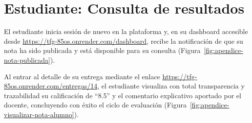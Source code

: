 
\section{Estudiante: Consulta de resultados}

El estudiante inicia sesi\'on de nuevo en la plataforma y, en su dashboard accesible desde \url{https://tfg-85os.onrender.com/dashboard}, recibe la notificaci\'on de que su nota ha sido publicada y est\'a disponible para su consulta (Figura~\ref{fig:apendice-nota-publicada}).


Al entrar al detalle de su entrega mediante el enlace \url{https://tfg-85os.onrender.com/entregas/14}, el estudiante visualiza con total transparencia y trazabilidad su calificaci\'on de ``8.5'' y el comentario explicativo aportado por el docente, concluyendo con \'exito el ciclo de evaluaci\'on (Figura~\ref{fig:apendice-visualizar-nota-alumno}).

